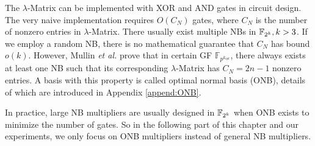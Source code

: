 The $\lambda$-Matrix can be implemented with XOR and AND gates in circuit design.
The very naive implementation requires $O(C_N)$ gates, where $C_N$ is the number of
nonzero entries in $\lambda$-Matrix.
There usually exist multiple NBs in ${\mathbb{F}}_{2^k}, k>3$. If we employ a random NB, there is no mathematical
guarantee that $C_N$ has bound $o(k)$. However,
Mullin {\it et al.} \cite{mullinONB} %
prove that in certain GF $\mathbb F_{p^{k_{opt}}}$, there always exists at least one NB such that 
its corresponding $\lambda$-Matrix has $C_N = 2n-1$ nonzero entries. A basis with this property is
called optimal normal basis (ONB), details of which are introduced in Appendix \ref{append:ONB}.

In practice, large NB multipliers are usually designed in ${\mathbb{F}}_{2^k}$ when ONB exists
to minimize the number of gates. So in the following part of this chapter and our experiments,
we only focus on ONB multipliers instead of general NB multipliers.


